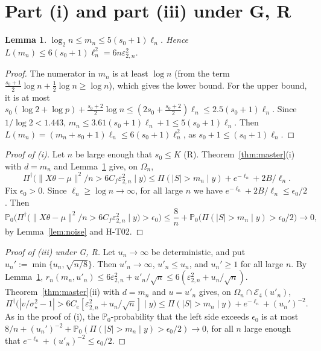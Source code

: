 \documentclass[11pt]{article}
\newtheorem{lemma}[theorem]{Lemma}
\theoremstyle{remark}
\renewcommand{\P}{\mathbb P}
\newcommand{\Pd}{\Pi^\dagger}
\newcommand{\ve}{\varepsilon}
\newcommand{\sst}{\sigma_\star}
\begin{document}
\section{Part (i) and part (iii) under G, R}\label{sec:fallback}

\begin{lemma}\label{lem:mn}
$\log_2n\le m_n\le5(s_0+1)\ell_n$. Hence $L(m_n)\le6(s_0+1)\ell_n^2=6n\ve_{2,n}^2$.
\end{lemma}

\begin{proof}
The numerator in $m_n$ is at least $\log n$ (from the term $\frac{s_0+1}{2}\log n+\frac12\log n\ge\log n$), which gives the lower bound. For the upper bound, it is at most $s_0(\log2+\log p)+\frac{s_0+2}2\log n\le(2s_0+\frac{s_0+2}2)\ell_n\le2.5(s_0+1)\ell_n$. Since $1/\log2<1.443$, $m_n\le3.61(s_0+1)\ell_n+1\le5(s_0+1)\ell_n$. Then $L(m_n)=(m_n+s_0+1)\ell_n\le6(s_0+1)\ell_n^2$, as $s_0+1\le(s_0+1)\ell_n$.
\end{proof}

\begin{proof}[Proof of (i)]
Let $n$ be large enough that $s_0\le K$ (R). Theorem~\ref{thm:master}(i) with $d=m_n$ and Lemma~\ref{lem:mn} give, on $\Omega_n$,
\[
\Pd\big(\|X\theta-\mu\|^2/n>6C_f\ve_{2,n}^2\mid y\big)\le\Pi(|S|>m_n\mid y)+e^{-\ell_n}+2B/\ell_n .
\]
Fix $\epsilon_0>0$. Since $\ell_n\ge\log n\to\infty$, for all large $n$ we have $e^{-\ell_n}+2B/\ell_n\le\epsilon_0/2$. Then
\[
\P_0\Big(\Pd\big(\|X\theta-\mu\|^2/n>6C_f\ve_{2,n}^2\mid y\big)>\epsilon_0\Big)\le\frac8n+\P_0\big(\Pi(|S|>m_n\mid y)>\epsilon_0/2\big)\to0,
\]
by Lemma~\ref{lem:noise} and H-T02.
\end{proof}

\begin{proof}[Proof of (iii) under G, R]
Let $u_n\to\infty$ be deterministic, and put $u_n':=\min\{u_n,\sqrt{n/8}\}$. Then $u'_n\to\infty$, $u'_n\le u_n$, and $u_n'\ge1$ for all large $n$. By Lemma~\ref{lem:mn}, $r_n(m_n,u'_n)\le6\ve_{2,n}^2+u'_n/\sqrt n\le6(\ve_{2,n}^2+u_n/\sqrt n)$. Theorem~\ref{thm:master}(ii) with $d=m_n$ and $u=u'_n$ gives, on $\Omega_n\cap\mathcal E_4(u'_n)$,
\[
\Pd\big(|v/\sst^2-1|>6C_e[\ve_{2,n}^2+u_n/\sqrt n]\mid y\big)\le\Pi(|S|>m_n\mid y)+e^{-\ell_n}+(u_n')^{-2}.
\]
As in the proof of (i), the $\P_0$-probability that the left side exceeds $\epsilon_0$ is at most $8/n+(u_n')^{-2}+\P_0(\Pi(|S|>m_n\mid y)>\epsilon_0/2)\to0$, for all $n$ large enough that $e^{-\ell_n}+(u'_n)^{-2}\le\epsilon_0/2$.
\end{proof}
\end{document}
